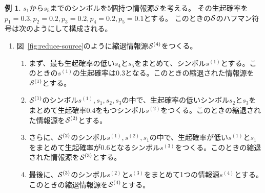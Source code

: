 \documentclass[pdflatex, ja=standard, a4paper]{bxjsarticle}
\theoremstyle{definition}
\newtheorem{example}{例}
\newcommand{\figref}[1]{図~\ref{#1}}
\begin{document}
\begin{screen}
    \begin{example} \label{ex:example-1}
        $s_1$から$s_5$までのシンボルを5個持つ情報源$\mathcal{S}$を考える。
        その生起確率を$p_1 = 0.3, p_2 = 0.2, p_3 = 0.2, p_4 = 0.2, p_5 = 0.1$とする。
        このときの$\mathcal{S}$のハフマン符号は次のようにして構成される。
        \begin{enumerate}
            \item \figref{fig:reduce-source}のように縮退情報源$\mathcal{S}^{(4)}$をつくる。
                \begin{enumerate}
                    \item まず、最も生起確率の低い$s_4$と$s_5$をまとめて、シンボル$s^{(1)}$とする。このときの$s^{(1)}$の生起確率は$0.3$となる。このときの縮退された情報源を$\mathcal{S}^{(1)}$とする。
                    \item $\mathcal{S}^{(1)}$のシンボル$s^{(1)}, s_1, s_2, s_3$の中で、生起確率の低いシンボル$s_2$と$s_3$をまとめて生起確率$0.4$をもつシンボル$s^{(2)}$をつくる。このときの縮退された情報源を$\mathcal{S}^{(2)}$とする。
                    \item さらに、$\mathcal{S}^{(2)}$のシンボル$s^{(1)}, s^{(2)}, s_1$の中で、生起確率が低い$s^{(1)}$と$s_1$をまとめて生起確率が$0.6$となるシンボル$s^{(3)}$をつくる。このときの縮退された情報源を$\mathcal{S}^{(3)}$とする。
                    \item 最後に、$\mathcal{S}^{(3)}$のシンボル$s^{(2)}$と$s^{(3)}$をまとめて1つの情報源$s^{(4)}$とする。このときの縮退情報源を$\mathcal{S}^{(4)}$とする。
                \end{enumerate}


\end{enumerate}
\end{example}
\end{screen}
\end{document}
